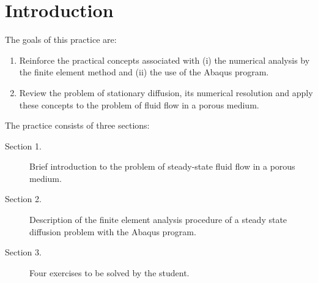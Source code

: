 \section*{Introduction}
 The goals of this
practice are:
\begin{enumerate}
\item Reinforce the practical concepts associated with (i) the
  numerical analysis by the finite element method and (ii) the use of
  the Abaqus program.
\item Review the problem of stationary diffusion, its numerical
  resolution and apply these concepts to the problem of fluid flow in a porous
  medium.
\end{enumerate}

The practice consists of three sections:
\begin{description}
\item[Section 1.] Brief introduction to the problem of steady-state fluid flow in a
  porous medium.
\item[Section 2.] Description of the finite element analysis procedure
  of a steady state diffusion problem with the Abaqus program.
\item[Section 3.] Four exercises to be solved by the student.
\end{description}